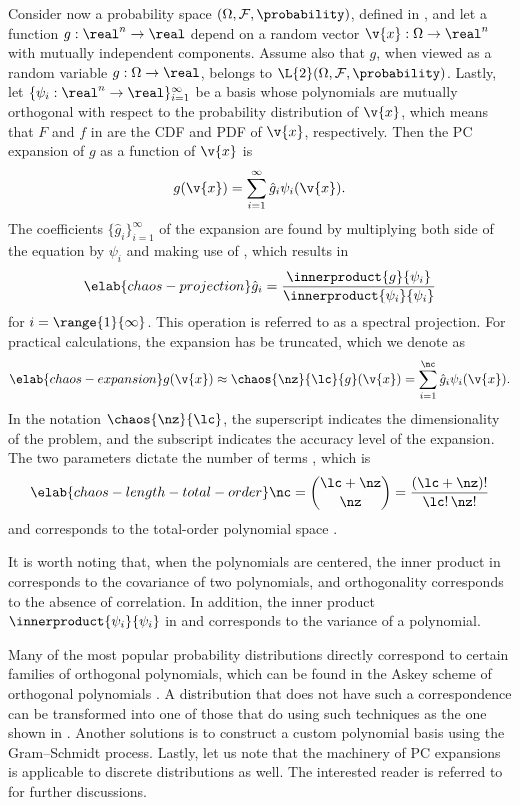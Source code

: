 Consider now a probability space $(\Omega, \mathcal{F}, \probability)$, defined
in , and let a function $g: \real^n \to \real$ depend
on a random vector $\v{x}: \Omega \to \real^n$ with mutually independent
components. Assume also that $g$, when viewed as a random variable $g: \Omega
\to \real$, belongs to $\L{2}(\Omega, \mathcal{F}, \probability)$. Lastly, let
$\{ \psi_i: \real^n \to \real \}_{i = 1}^\infty$ be a basis whose polynomials
are mutually orthogonal with respect to the probability distribution of $\v{x}$,
which means that $F$ and $f$ in  are the \ac{CDF}
and \ac{PDF} of $\v{x}$, respectively. Then the \ac{PC} expansion of $g$ as a
function of $\v{x}$ is
\[
  g(\v{x}) = \sum_{i = 1}^\infty \hat{g}_i \psi_i(\v{x}).
\]
The coefficients $\{ \hat{g}_i \}_{i = 1}^\infty$ of the expansion are found by
multiplying both side of the equation by $\psi_i$ and making use of
, which results in
\begin{equation} \elab{chaos-projection}
  \hat{g}_i = \frac{\innerproduct{g}{\psi_i}}{\innerproduct{\psi_i}{\psi_i}}
\end{equation}
for $i = \range{1}{\infty}$. This operation is referred to as a spectral
projection. For practical calculations, the expansion has be truncated, which we
denote as
\begin{equation} \elab{chaos-expansion}
  g(\v{x}) \approx \chaos{\nz}{\lc}{g}(\v{x}) = \sum_{i = 1}^\nc \hat{g}_i \psi_i(\v{x}).
\end{equation}
In the notation $\chaos{\nz}{\lc}$, the superscript \nz indicates the
dimensionality of the problem, and the subscript \lc indicates the accuracy
level of the expansion. The two parameters dictate the number of terms \nc,
which is
\begin{equation} \elab{chaos-length-total-order}
  \nc = { \lc + \nz \choose \nz } = \frac{(\lc + \nz)!}{\lc! \, \nz!}
\end{equation}
and corresponds to the total-order polynomial space \cite{eldred2008, beck2011}.

It is worth noting that, when the polynomials are centered, the inner product in
 corresponds to the covariance of two
polynomials, and orthogonality corresponds to the absence of correlation. In
addition, the inner product $\innerproduct{\psi_i}{\psi_i}$ in
 and  corresponds to the
variance of a polynomial.

Many of the most popular probability distributions directly correspond to
certain families of orthogonal polynomials, which can be found in the Askey
scheme of orthogonal polynomials \cite{xiu2010}. A distribution that does not
have such a correspondence can be transformed into one of those that do using
such techniques as the one shown in . Another
solutions is to construct a custom polynomial basis using the Gram--Schmidt
process. Lastly, let us note that the machinery of \ac{PC} expansions is
applicable to discrete distributions as well. The interested reader is referred
to \cite{xiu2010} for further discussions.
